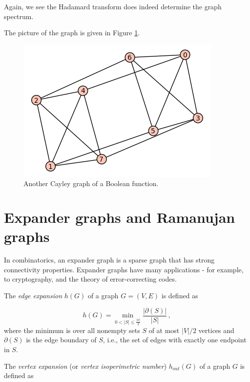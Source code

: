 Again, we see the Hadamard transform does indeed determine the graph spectrum.

The picture of the graph is given in Figure \ref{fig:distance_connectivity:bent-fcns-cayley-graphs2}.

\begin{figure}[!htbp]
\centering
{}
\includegraphics{image/distance-connectivity/bent-fcns-cayley-graphs2}
\caption{Another Cayley graph of a Boolean function.}
\label{fig:distance_connectivity:bent-fcns-cayley-graphs2}
\end{figure}






\section{Expander graphs and Ramanujan graphs}


In combinatorics, an expander graph is a sparse graph that has strong
connectivity properties.
Expander graphs have many applications - for example, to cryptography,
and the theory of error-correcting codes.

The {\it edge expansion} $h(G)$ of a graph
$G=(V,E)$ is defined as

\[
    h(G) = \min_{0 < |S| \le \frac{|V|}{2} } \frac{|\partial(S)|}{|S|}\,,
\]
where the minimum is over all nonempty sets $S$ of at most
$|V| / 2$ vertices and
$\partial(S)$ is the edge boundary of $S$, i.e., the set of
edges with exactly one endpoint in $S$.

The {\it vertex expansion} (or {\it vertex isoperimetric number})
$h_{out}(G)$ of a graph $G$ is defined as


